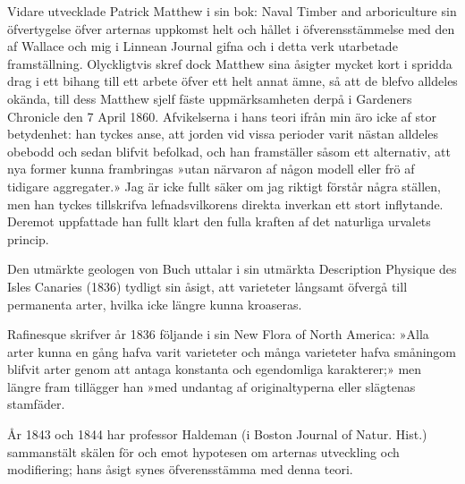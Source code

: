Vidare utvecklade Patrick Matthew i sin bok: Naval Timber and arboriculture sin öfvertygelse öfver arternas uppkomst helt och hållet i öfverensstämmelse med den af Wallace och mig i Linnean Journal gifna och i detta verk utarbetade framställning. Olyckligtvis skref dock Matthew sina åsigter mycket kort i spridda drag i ett bihang till ett arbete öfver ett helt annat ämne, så att de blefvo alldeles okända, till dess Matthew sjelf fäste uppmärksamheten derpå i Gardeners Chronicle den 7 April 1860. Afvikelserna i hans teori ifrån min äro icke af stor betydenhet: han tyckes anse, att jorden vid vissa perioder varit nästan alldeles obebodd och sedan blifvit befolkad, och han framställer såsom ett alternativ, att nya former kunna frambringas »utan närvaron af någon modell eller frö af tidigare aggregater.» Jag är icke fullt säker om jag riktigt förstår några ställen, men han tyckes tillskrifva lefnadsvilkorens direkta inverkan ett stort inflytande. Deremot uppfattade han fullt klart den fulla kraften af det naturliga urvalets princip.

Den utmärkte geologen von Buch uttalar i sin utmärkta Description Physique des Isles Canaries (1836) tydligt sin åsigt, att varieteter långsamt öfvergå till permanenta arter, hvilka icke längre kunna kroaseras.

Rafinesque skrifver år 1836 följande i sin New Flora of North America: »Alla arter kunna en gång hafva varit varieteter och många varieteter hafva småningom blifvit arter genom att antaga konstanta och egendomliga karakterer;» men längre fram tillägger han »med undantag af originaltyperna eller slägtenas stamfäder.

År 1843 och 1844 har professor Haldeman (i Boston Journal of Natur. Hist.) sammanstält skälen för och emot hypotesen om arternas utveckling och modifiering; hans åsigt synes öfverensstämma med denna teori.

